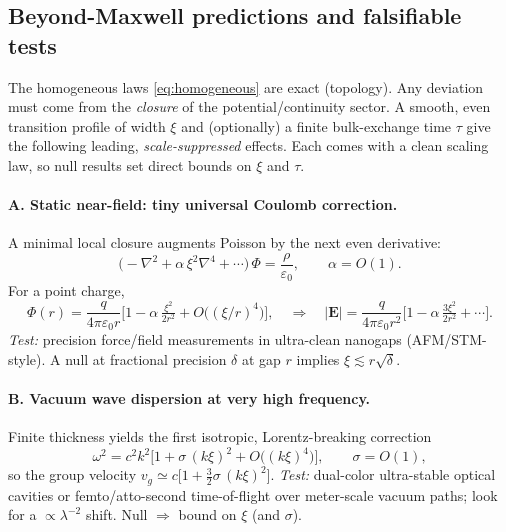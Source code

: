 \subsection{Beyond-Maxwell predictions and falsifiable tests}
\label{subsec:EM_predictions}
The homogeneous laws \eqref{eq:homogeneous} are exact (topology). Any deviation must come from the \emph{closure} of the potential/continuity sector. A smooth, even transition profile of width $\xi$ and (optionally) a finite bulk-exchange time $\tau$ give the following leading, \emph{scale-suppressed} effects. Each comes with a clean scaling law, so null results set direct bounds on $\xi$ and $\tau$.

\paragraph{A. Static near-field: tiny universal Coulomb correction.}
A minimal local closure augments Poisson by the next even derivative:
\begin{equation}
\big(-\nabla^2 + \alpha\,\xi^2 \nabla^4 + \cdots\big)\,\Phi
=\frac{\rho}{\varepsilon_0},\qquad \alpha=O(1).
\end{equation}
For a point charge,
\begin{equation}
\Phi(r)=\frac{q}{4\pi\varepsilon_0 r}
\Big[1-\alpha\,\tfrac{\xi^2}{2r^2}+O\big((\xi/r)^4\big)\Big],
\quad
\Rightarrow\quad
|\mathbf E|=\frac{q}{4\pi\varepsilon_0 r^2}\Big[1-\alpha\,\tfrac{3\xi^2}{2r^2}+\cdots\Big].
\end{equation}
\emph{Test:} precision force/field measurements in ultra-clean nanogaps (AFM/STM-style). A null at fractional precision $\delta$ at gap $r$ implies $\xi \lesssim r\sqrt{\delta}$.

\paragraph{B. Vacuum wave dispersion at very high frequency.}
Finite thickness yields the first isotropic, Lorentz-breaking correction
\begin{equation}
\omega^2=c^2 k^2\Big[1+\sigma\,(k\xi)^2+O\big((k\xi)^4\big)\Big],\qquad \sigma=O(1),
\end{equation}
so the group velocity $v_g\simeq c\big[1+\tfrac{3}{2}\sigma\,(k\xi)^2\big]$.
\emph{Test:} dual-color ultra-stable optical cavities or femto/atto-second time-of-flight over meter-scale vacuum paths; look for a $\propto\lambda^{-2}$ shift. Null $\Rightarrow$ bound on $\xi$ (and $\sigma$).

